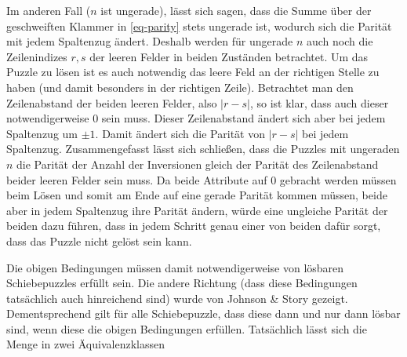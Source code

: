 \documentclass{whswinvcbook}
\begin{document}
Im anderen Fall ($n$ ist ungerade), lässt sich sagen, dass die Summe über der geschweiften Klammer in \ref{eq-parity} stets ungerade ist, wodurch sich die Parität mit jedem Spaltenzug ändert. Deshalb werden für ungerade $n$ auch noch die Zeilenindizes $r,s$ der leeren Felder in beiden Zuständen betrachtet. Um das Puzzle zu lösen ist es auch notwendig das leere Feld an der richtigen Stelle zu haben (und damit besonders in der richtigen Zeile). Betrachtet man den Zeilenabstand der beiden leeren Felder, also $|r-s|$, so ist klar, dass auch dieser notwendigerweise $0$ sein muss. Dieser Zeilenabstand ändert sich aber bei jedem Spaltenzug um $\pm1$. Damit ändert sich die Parität von $|r-s|$ bei jedem Spaltenzug. Zusammengefasst lässt sich schließen, dass die Puzzles mit ungeraden $n$ die Parität der Anzahl der Inversionen gleich der Parität des Zeilenabstand beider leeren Felder sein muss. Da beide Attribute auf $0$ gebracht werden müssen beim Lösen und somit am Ende auf eine gerade Parität kommen müssen, beide aber in jedem Spaltenzug ihre Parität ändern, würde eine ungleiche Parität der beiden dazu führen, dass in jedem Schritt genau einer von beiden dafür sorgt, dass das Puzzle nicht gelöst sein kann.

Die obigen Bedingungen müssen damit notwendigerweise von lösbaren Schiebepuzzles erfüllt sein. Die andere Richtung (dass diese Bedingungen tatsächlich auch hinreichend sind) wurde von Johnson \& Story \cite{fift} gezeigt. Dementsprechend gilt für alle Schiebepuzzle, dass diese dann und nur dann lösbar sind, wenn diese die obigen Bedingungen erfüllen. Tatsächlich lässt sich die Menge in zwei Äquivalenzklassen

\backmatter

\preparebibliography

\end{document}
